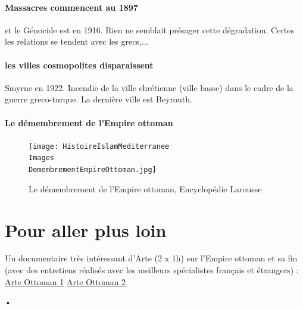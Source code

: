  \paragraph{Massacres commencent au 1897} et le Génocide est en 1916. Rien ne semblait présager cette dégradation. Certes les relations se tendent avec les grecs,...

 \paragraph{les villes cosmopolites disparaissent} Smyrne en 1922. Incendie de la ville chrétienne (ville basse) dans le cadre de la guerre greco-turque. 
 La dernière ville est Beyrouth. 


\paragraph{Le démembrement de
l’Empire ottoman}
\begin{figure}
    \centering
        \caption{Le démembrement de
l’Empire ottoman,
Encyclopédie Larousse}
    \texttt{[image: HistoireIslamMediterranee\\Images\\DemembrementEmpireOttoman.jpg]}

    \label{fig:my_label}
\end{figure}

 \section{Pour aller plus loin}

 Un documentaire très intéressant d’Arte (2 x 1h) sur l’Empire ottoman
et sa fin (avec des entretiens réalisés avec les meilleurs spécialistes
français et étrangers) :
\href{https://www.dailymotion.com/video/x4a7vu8}{Arte Ottoman 1}
\href{Https://www.dailymotion.com/video/x3zpz4e}{Arte Ottoman 2}

•
